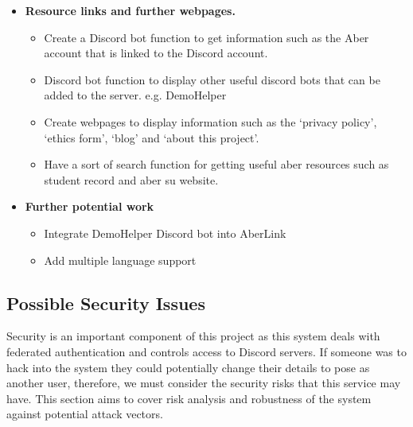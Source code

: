 \begin{itemize}
	\item \textbf{Resource links and further webpages.} 
	\begin{itemize}
		\item Create a Discord bot function to get information such as the Aber account that is linked to the Discord account.
		\item Discord bot function to display other useful discord bots that can be added to the server. e.g. DemoHelper \cite {demohelper}
		\item Create webpages to display information such as the `privacy policy', `ethics form', `blog' and `about this project'.
		\item Have a sort of search function for getting useful aber resources such as student record and aber su website.
	\end{itemize}
	
	\item \textbf{Further potential work}
	\begin{itemize}
		\item Integrate DemoHelper Discord bot into AberLink
		\item Add multiple language support
	\end{itemize}
\end{itemize}

\subsection{Possible Security Issues}
Security is an important component of this project as this system deals with federated authentication and controls access to Discord servers. If someone was to hack into the system they could potentially change their details to pose as another user, therefore, we must consider the security risks that this service may have. This section aims to cover risk analysis and robustness of the system against potential attack vectors.

